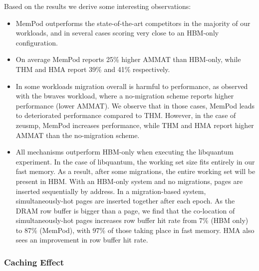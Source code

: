 Based on the results we derive some interesting observations:
\begin{itemize}[leftmargin=0.4cm]
\setlength\itemsep{0em}
	\item MemPod outperforms the state-of-the-art competitors in the majority of our workloads, and in several cases scoring very close to an HBM-only configuration. 
	\item On average MemPod reports 25\% higher AMMAT than HBM-only, while THM and HMA report 39\% and 41\% respectively.
	\item In some workloads migration overall is harmful to performance, 
as observed with the bwaves workload, where a no-migration scheme reports 
higher performance (lower AMMAT). We observe that in those cases, MemPod leads to deteriorated performance compared to THM. However, in the case of zeusmp, 
MemPod increases performance, while THM and HMA report higher AMMAT than the no-migration scheme.
	\item All mechanisms outperform HBM-only when executing the libquantum experiment. In the case of libquantum, the working set size fits entirely in our fast memory. As a result, after some migrations, the entire working set will be present in HBM.  With an HBM-only system and no migrations, pages
are inserted sequentially by address.  In a migration-based system, 
simultaneously-hot pages are inserted together after each epoch.  As the
DRAM row buffer is bigger than a page, we find that the co-location of
simultaneously-hot pages increases row buffer hit rate from 7\% (HBM only)
to 87\% (MemPod), with 97\% of those taking place in fast memory.  HMA also sees an improvement in row buffer hit rate.
\end{itemize}

\subsubsection{Caching Effect}

